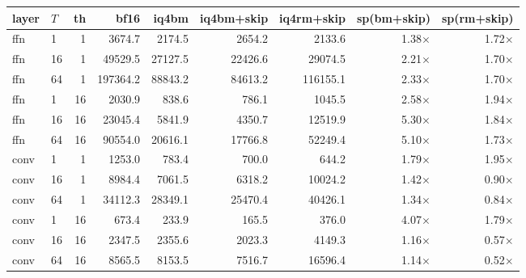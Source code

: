 \begin{tabular}{llrrrrrrr}
\toprule
layer & $T$ & th & bf16 & iq4bm & iq4bm+skip & iq4rm+skip & sp(bm+skip) & sp(rm+skip) \\
\midrule
ffn & 1 & 1 & 3674.7 & 2174.5 & 2654.2 & 2133.6 & 1.38$\times$ & 1.72$\times$ \\
ffn & 16 & 1 & 49529.5 & 27127.5 & 22426.6 & 29074.5 & 2.21$\times$ & 1.70$\times$ \\
ffn & 64 & 1 & 197364.2 & 88843.2 & 84613.2 & 116155.1 & 2.33$\times$ & 1.70$\times$ \\
ffn & 1 & 16 & 2030.9 & 838.6 & 786.1 & 1045.5 & 2.58$\times$ & 1.94$\times$ \\
ffn & 16 & 16 & 23045.4 & 5841.9 & 4350.7 & 12519.9 & 5.30$\times$ & 1.84$\times$ \\
ffn & 64 & 16 & 90554.0 & 20616.1 & 17766.8 & 52249.4 & 5.10$\times$ & 1.73$\times$ \\
conv & 1 & 1 & 1253.0 & 783.4 & 700.0 & 644.2 & 1.79$\times$ & 1.95$\times$ \\
conv & 16 & 1 & 8984.4 & 7061.5 & 6318.2 & 10024.2 & 1.42$\times$ & 0.90$\times$ \\
conv & 64 & 1 & 34112.3 & 28349.1 & 25470.4 & 40426.1 & 1.34$\times$ & 0.84$\times$ \\
conv & 1 & 16 & 673.4 & 233.9 & 165.5 & 376.0 & 4.07$\times$ & 1.79$\times$ \\
conv & 16 & 16 & 2347.5 & 2355.6 & 2023.3 & 4149.3 & 1.16$\times$ & 0.57$\times$ \\
conv & 64 & 16 & 8565.5 & 8153.5 & 7516.7 & 16596.4 & 1.14$\times$ & 0.52$\times$ \\
\bottomrule
\end{tabular}
